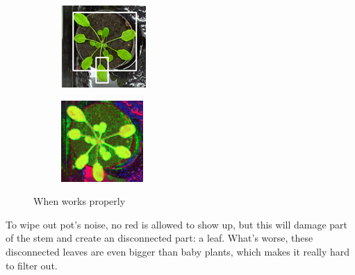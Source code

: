 \documentclass[conference]{IEEEtran}
\begin{document}
\begin{figure}[h!]
\centering
\begin{subfigure}[h!]{0.24\textwidth}
    \centering
    \includegraphics[width=\textwidth]{img/task1_good_class.png}
\end{subfigure}
\hfill
\begin{subfigure}[h!]{0.24\textwidth}
    \centering
    \includegraphics[width=\textwidth]{img/task1_good_class_enhanced.png}
\end{subfigure}
\caption{When works properly}
\label{fig:task1_good_eg}
\end{figure}
To wipe out pot’s noise, no red is allowed to show up, but this will damage part of the stem and create an disconnected part: a leaf. What’s worse, these disconnected leaves are even bigger than baby plants, which makes it really hard to filter out. 
\end{document}

